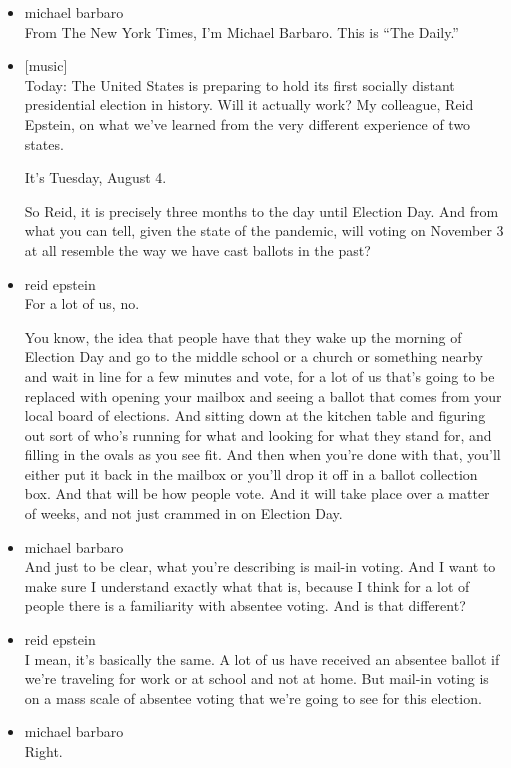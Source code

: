 \begin{itemize}
\item
  michael barbaro\\
  From The New York Times, I'm Michael Barbaro. This is ``The Daily.''
\item
  {[}music{]}\\
  Today: The United States is preparing to hold its first socially
  distant presidential election in history. Will it actually work? My
  colleague, Reid Epstein, on what we've learned from the very different
  experience of two states.

  It's Tuesday, August 4.

  So Reid, it is precisely three months to the day until Election Day.
  And from what you can tell, given the state of the pandemic, will
  voting on November 3 at all resemble the way we have cast ballots in
  the past?
\item
  reid epstein\\
  For a lot of us, no.

  You know, the idea that people have that they wake up the morning of
  Election Day and go to the middle school or a church or something
  nearby and wait in line for a few minutes and vote, for a lot of us
  that's going to be replaced with opening your mailbox and seeing a
  ballot that comes from your local board of elections. And sitting down
  at the kitchen table and figuring out sort of who's running for what
  and looking for what they stand for, and filling in the ovals as you
  see fit. And then when you're done with that, you'll either put it
  back in the mailbox or you'll drop it off in a ballot collection box.
  And that will be how people vote. And it will take place over a matter
  of weeks, and not just crammed in on Election Day.
\item
  michael barbaro\\
  And just to be clear, what you're describing is mail-in voting. And I
  want to make sure I understand exactly what that is, because I think
  for a lot of people there is a familiarity with absentee voting. And
  is that different?
\item
  reid epstein\\
  I mean, it's basically the same. A lot of us have received an absentee
  ballot if we're traveling for work or at school and not at home. But
  mail-in voting is on a mass scale of absentee voting that we're going
  to see for this election.
\item
  michael barbaro\\
  Right.


\end{itemize}
